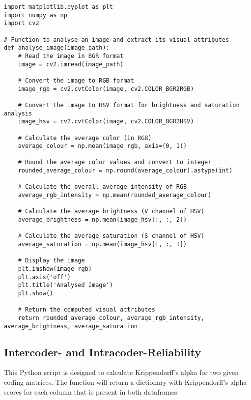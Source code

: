 \begin{lstlisting}
import matplotlib.pyplot as plt
import numpy as np
import cv2

# Function to analyse an image and extract its visual attributes
def analyse_image(image_path):
    # Read the image in BGR format
    image = cv2.imread(image_path)
    
    # Convert the image to RGB format
    image_rgb = cv2.cvtColor(image, cv2.COLOR_BGR2RGB)
    
    # Convert the image to HSV format for brightness and saturation analysis
    image_hsv = cv2.cvtColor(image, cv2.COLOR_BGR2HSV)
    
    # Calculate the average color (in RGB)
    average_colour = np.mean(image_rgb, axis=(0, 1))
    
    # Round the average color values and convert to integer
    rounded_average_colour = np.round(average_colour).astype(int)

    # Calculate the overall average intensity of RGB
    average_rgb_intensity = np.mean(rounded_average_colour)

    # Calculate the average brightness (V channel of HSV)
    average_brightness = np.mean(image_hsv[:, :, 2])
    
    # Calculate the average saturation (S channel of HSV)
    average_saturation = np.mean(image_hsv[:, :, 1])
    
    # Display the image
    plt.imshow(image_rgb)
    plt.axis('off')
    plt.title('Analysed Image')
    plt.show()
        
    # Return the computed visual attributes
    return rounded_average_colour, average_rgb_intensity, average_brightness, average_saturation
\end{lstlisting}

\subsection{Intercoder- and Intracoder-Reliability}
\label{subsec:reliability-code-script}

This Python script is designed to calculate Krippendorff's alpha for two given coding matrices. The function will return a dictionary with Krippendorff's alpha scores for each column that is present in both dataframes.

